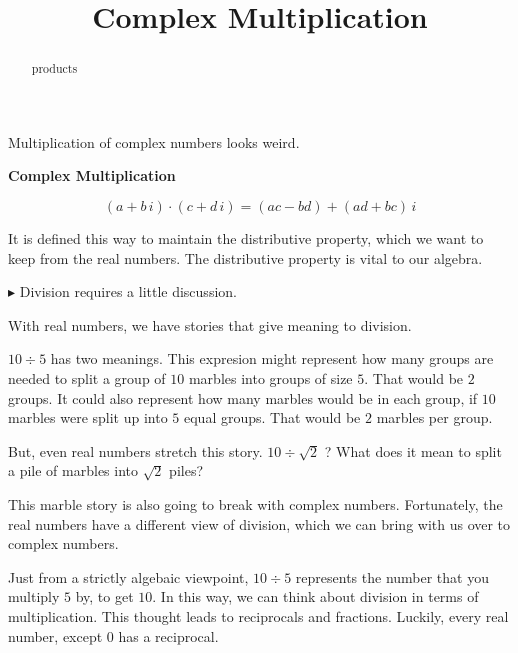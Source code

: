 \documentclass{ximera}
\title{Complex Multiplication}
\begin{document}
\begin{abstract}
products
\end{abstract}
\maketitle


Multiplication of complex numbers looks weird.





\begin{definition} \textbf{\textcolor{green!50!black}{Complex Multiplication}}


\[    (a + b \, i) \cdot (c + d \, i) = (ac-bd) + (ad+bc) \, i           \]

\end{definition}


It is defined this way to maintain the distributive property, which we want to keep from the real numbers.  The distributive property is vital to our algebra.



$\blacktriangleright$ Division requires a little discussion.



With real numbers, we have stories that give meaning to division.


$10 \div 5$ has two meanings.  This expresion might represent how many groups are needed to split a group of $10$ marbles into groups of size $5$.  That would be $2$ groups.  It could also represent how many marbles would be in each group, if $10$ marbles were split up into $5$ equal groups.  That would be $2$ marbles per group.


But, even real numbers stretch this story.  $10 \div \sqrt{2}$ ?  What does it mean to split a pile of marbles into $\sqrt{2}$ piles?

This marble story is also going to break with complex numbers.  Fortunately, the real numbers have a different view of division, which we can bring with us over to complex numbers.





Just from a strictly algebaic viewpoint, $10 \div 5$ represents the number that you multiply $5$ by, to get $10$.  In this way, we can think about division in terms of multiplication.  This thought leads to reciprocals and fractions.  Luckily, every real number, except $0$ has a reciprocal.  
\end{document}
